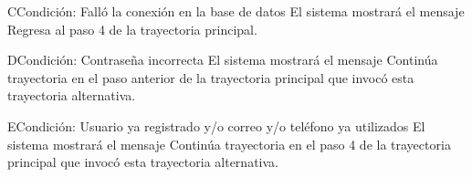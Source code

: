 	\begin{UCtrayectoriaA}{C}{Condición: Falló la conexión en la base de datos}
		\UCpaso[\UCsist] El sistema mostrará el mensaje 
		\UCpaso[\UCsist] Regresa al paso 4 de la trayectoria principal. 
	\end{UCtrayectoriaA}
	\begin{UCtrayectoriaA}{D}{Condición: Contraseña incorrecta}
		\UCpaso[\UCsist] El sistema mostrará el mensaje 
		\UCpaso[\UCsist] Continúa trayectoria en el paso anterior de la trayectoria  principal que invocó esta trayectoria alternativa. 
	\end{UCtrayectoriaA}
	\begin{UCtrayectoriaA}{E}{Condición: Usuario ya registrado y/o correo y/o teléfono ya utilizados}
		\UCpaso[\UCsist] El sistema mostrará el mensaje 
		\UCpaso[\UCsist] Continúa trayectoria en el paso 4 de la trayectoria  principal que invocó esta trayectoria alternativa. 
	\end{UCtrayectoriaA}

